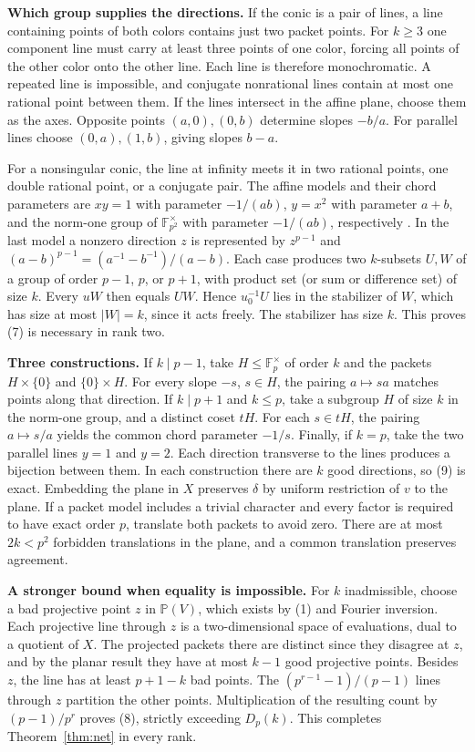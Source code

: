 \documentclass[11pt,letterpaper]{article}
\newcommand{\F}{\mathbb F}
\newcommand{\subhead}[1]{\par\smallskip\noindent\textbf{#1.}\enspace}
\begin{document}
\subhead{Which group supplies the directions}
If the conic is a pair of lines, a line containing points of both colors contains just two packet points. For $k\ge3$ one component line must carry at least three points of one color, forcing all points of the other color onto the other line. Each line is therefore monochromatic. A repeated line is impossible, and conjugate nonrational lines contain at most one rational point between them. If the lines intersect in the affine plane, choose them as the axes. Opposite points $(a,0),(0,b)$ determine slopes $-b/a$. For parallel lines choose $(0,a),(1,b)$, giving slopes $b-a$.

For a nonsingular conic, the line at infinity meets it in two rational points, one double rational point, or a conjugate pair. The affine models and their chord parameters are $xy=1$ with parameter $-1/(ab)$, $y=x^2$ with parameter $a+b$, and the norm-one group of $\F_{p^2}^{\times}$ with parameter $-1/(ab)$, respectively \cite[Section~5]{BKM}. In the last model a nonzero direction $z$ is represented by $z^{p-1}$ and $(a-b)^{p-1}=(a^{-1}-b^{-1})/(a-b)$. Each case produces two $k$-subsets $U,W$ of a group of order $p-1$, $p$, or $p+1$, with product set (or sum or difference set) of size $k$. Every $uW$ then equals $UW$. Hence $u_0^{-1}U$ lies in the stabilizer of $W$, which has size at most $|W|=k$, since it acts freely. The stabilizer has size $k$. This proves (7) is necessary in rank two.

\subhead{Three constructions}
If $k\mid p-1$, take $H\le\F_p^\times$ of order $k$ and the packets $H\times\{0\}$ and $\{0\}\times H$. For every slope $-s$, $s\in H$, the pairing $a\mapsto sa$ matches points along that direction. If $k\mid p+1$ and $k\le p$, take a subgroup $H$ of size $k$ in the norm-one group, and a distinct coset $tH$. For each $s\in tH$, the pairing $a\mapsto s/a$ yields the common chord parameter $-1/s$. Finally, if $k=p$, take the two parallel lines $y=1$ and $y=2$. Each direction transverse to the lines produces a bijection between them. In each construction there are $k$ good directions, so (9) is exact. Embedding the plane in $X$ preserves $\delta$ by uniform restriction of $v$ to the plane. If a packet model includes a trivial character and every factor is required to have exact order $p$, translate both packets to avoid zero. There are at most $2k<p^2$ forbidden translations in the plane, and a common translation preserves agreement.

\subhead{A stronger bound when equality is impossible}
For $k$ inadmissible, choose a bad projective point $z$ in $\mathbb P(V)$, which exists by (1) and Fourier inversion. Each projective line through $z$ is a two-dimensional space of evaluations, dual to a quotient of $X$. The projected packets there are distinct since they disagree at $z$, and by the planar result they have at most $k-1$ good projective points. Besides $z$, the line has at least $p+1-k$ bad points. The $(p^{r-1}-1)/(p-1)$ lines through $z$ partition the other points. Multiplication of the resulting count by $(p-1)/p^r$ proves (8), strictly exceeding $D_p(k)$. This completes Theorem~\ref{thm:net} in every rank.
\end{document}
